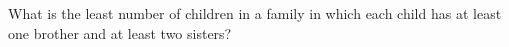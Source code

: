 What is the least number of children in a family in which each child has at least one brother and at least two sisters?
